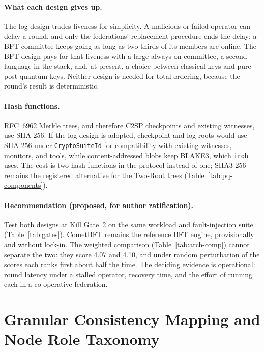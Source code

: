 \documentclass[10pt,twoside,openany]{book}
\theoremstyle{dpepstyle}
\begin{document}
\paragraph{What each design gives up.} The log design trades liveness for simplicity. A malicious or failed operator can delay a round, and only the federations' replacement procedure ends the delay; a BFT committee keeps going as long as two-thirds of its members are online. The BFT design pays for that liveness with a large always-on committee, a second language in the stack, and, at present, a choice between classical keys and pure post-quantum keys. Neither design is needed for total ordering, because the round's result is deterministic.

\paragraph{Hash functions.} RFC~6962 Merkle trees, and therefore C2SP checkpoints and existing witnesses, use SHA-256. If the log design is adopted, checkpoint and log roots would use SHA-256 under \texttt{CryptoSuiteId} for compatibility with existing witnesses, monitors, and tools, while content-addressed blobs keep BLAKE3, which \texttt{iroh} uses. The cost is two hash functions in the protocol instead of one; SHA3-256 remains the registered alternative for the Two-Root trees (Table~\ref{tab:pq-components}).

\paragraph{Recommendation (proposed, for author ratification).} Test both designs at Kill Gate~2 on the same workload and fault-injection suite (Table~\ref{tab:gates}). CometBFT remains the reference BFT engine, provisionally and without lock-in. The weighted comparison (Table~\ref{tab:arch-comp}) cannot separate the two: they score 4.07 and 4.10, and under random perturbation of the scores each ranks first about half the time. The deciding evidence is operational: round latency under a stalled operator, recovery time, and the effort of running each in a co-operative federation.

\section{Granular Consistency Mapping and Node Role Taxonomy}
\label{sec:roles}
\end{document}
